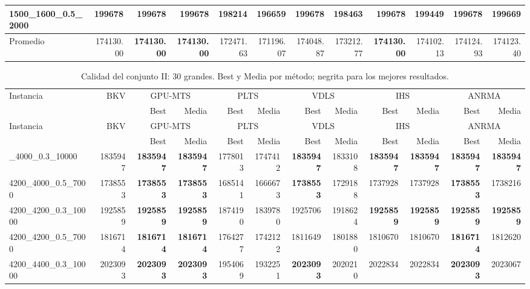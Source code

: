 \begin{landscape}
\begin{longtable}{lrrrrrrrrrrr}
1500\_1600\_0.5\_2000 & 199678 & \textbf{199678} & \textbf{199678} & 198214 & 196659 & \textbf{199678} & 198463 & \textbf{199678} & 199449 & \textbf{199678} & 199669\\
\midrule
Promedio & 174130.00 & \textbf{174130.00} & \textbf{174130.00} & 172471.63 & 171196.07 & 174048.87 & 173212.77 & \textbf{174130.00} & 174102.13 & 174124.93 & 174123.40\\
\end{longtable}\endgroup\clearpage
\begingroup\footnotesize\setlength{\tabcolsep}{2.5pt}\renewcommand{\arraystretch}{.88}
\begin{longtable}{lrrrrrrrrrrr}
\caption{{Calidad del conjunto II: 30 grandes. Best y Media por método; negrita para los mejores resultados.}}\label{tab:full-c2-large}\\
\toprule
Instancia & BKV & \multicolumn{2}{c}{GPU-MTS} & \multicolumn{2}{c}{PLTS} & \multicolumn{2}{c}{VDLS} & \multicolumn{2}{c}{IHS} & \multicolumn{2}{c}{ANRMA}\\
 &  & Best & Media & Best & Media & Best & Media & Best & Media & Best & Media\\
\midrule\endfirsthead
Instancia & BKV & \multicolumn{2}{c}{GPU-MTS} & \multicolumn{2}{c}{PLTS} & \multicolumn{2}{c}{VDLS} & \multicolumn{2}{c}{IHS} & \multicolumn{2}{c}{ANRMA}\\
 &  & Best & Media & Best & Media & Best & Media & Best & Media & Best & Media\\
\midrule\endhead
\bottomrule\endlastfoot
4200\_4000\_0.3\_10000 & 1835947 & \textbf{1835947} & \textbf{1835947} & 1778013 & 1747412 & \textbf{1835947} & 1833108 & \textbf{1835947} & \textbf{1835947} & \textbf{1835947} & \textbf{1835947}\\
4200\_4000\_0.5\_7000 & 1738553 & \textbf{1738553} & \textbf{1738553} & 1685141 & 1666673 & \textbf{1738553} & 1729188 & 1737928 & 1737928 & \textbf{1738553} & 1738216\\
4200\_4200\_0.3\_10000 & 1925859 & \textbf{1925859} & \textbf{1925859} & 1874190 & 1839780 & 1925706 & 1918624 & \textbf{1925859} & \textbf{1925859} & \textbf{1925859} & \textbf{1925859}\\
4200\_4200\_0.5\_7000 & 1816714 & \textbf{1816714} & \textbf{1816714} & 1764277 & 1742122 & 1811649 & 1801880 & 1810670 & 1810670 & \textbf{1816714} & 1812620\\
4200\_4400\_0.3\_10000 & 2023093 & \textbf{2023093} & \textbf{2023093} & 1954069 & 1932251 & \textbf{2023093} & 2020210 & 2022834 & 2022834 & \textbf{2023093} & 2023067\\

\end{longtable}
\end{landscape}
